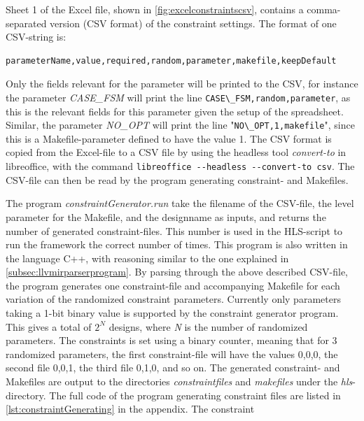 Sheet 1 of the Excel file, shown in \cref{fig:excelconstraintscsv}, contains a comma-separated version (CSV format) of the constraint settings. The format of one CSV-string is:
\begin{verbatim}
parameterName,value,required,random,parameter,makefile,keepDefault
\end{verbatim}
Only the fields relevant for the parameter will be printed to the CSV, for instance the parameter \textit{CASE\_FSM} will print the line \verb!CASE\_FSM,random,parameter!, as this is the relevant fields for this parameter given the setup of the spreadsheet. Similar, the parameter \textit{NO\_OPT} will print the line "\verb!NO\_OPT,1,makefile!", since this is a Makefile-parameter defined to have the value 1. The CSV format is copied from the Excel-file to a CSV file by using the headless tool \textit{convert-to} in libreoffice, with the command \verb!libreoffice --headless --convert-to csv!. The CSV-file can then be read by the program generating constraint- and Makefiles. 

The program \textit{constraintGenerator.run} take the filename of the CSV-file, the level parameter for the Makefile, and the designname as inputs, and returns the number of generated constraint-files. This number is used in the HLS-script to run the framework the correct number of times. This program is also written in the language C++, with reasoning similar to the one explained in \cref{subsec:llvmirparserprogram}. By parsing through the above described CSV-file, the program generates one constraint-file and accompanying Makefile for each variation of the randomized constraint parameters. Currently only parameters taking a 1-bit binary value is supported by the constraint generator program. This gives a total of $2^N$ designs, where \textit{N} is the number of randomized parameters. The constraints is set using a binary counter, meaning that for 3 randomized parameters, the first constraint-file will have the values 0,0,0, the second file 0,0,1, the third file 0,1,0, and so on. The generated constraint- and Makefiles are output to the directories \textit{constraintfiles} and \textit{makefiles} under the \textit{hls}-directory. The full code of the program generating constraint files are listed in \cref{lst:constraintGenerating} in the appendix. The constraint

